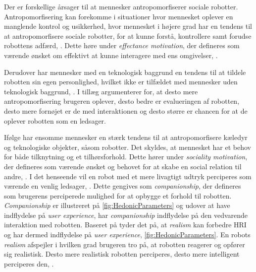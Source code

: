 Der er forskellige årsager til at mennesker antropomorfiserer sociale robotter. Antropomorfisering kan forekomme i situationer hvor mennesket oplever en manglende kontrol og usikkerhed, hvor mennesket i højere grad har en tendens til at antropomorfisere sociale robotter, for at kunne forstå, kontrollere samt forudse robottens adfærd, \parencite[s. 1478]{PDF:ExploringInfluencingVariable}. Dette høre under \textit{effectance motivation}, der defineres som værende ønsket om effektivt at kunne interagere med ens omgivelser, \parencite[s. 62]{PDF:EffectsOfAnticipatedHRI}.

Derudover har mennesker med en teknologisk baggrund en tendens til at tildele robotten sin egen personlighed, hvilket ikke er tilfældet med mennesker uden teknologisk baggrund, \parencite[s. 19]{PDF:CloseButNotStuck}. I tillæg argumenterer \textcite[s. 2]{PDF:SharingALifeHarvey} for, at desto mere antropomorfisering brugeren oplever, desto bedre er evalueringen af robotten, desto mere fornøjet er de med interaktionen og desto større er chancen for at de oplever robotten som en ledsager.

Ifølge \textcite[s. 61]{PDF:EffectsOfAnticipatedHRI} har ensomme mennesker en stærk tendens til at antropomorfisere kæledyr og teknologiske objekter, såsom robotter. Det skyldes, at mennesket har et behov for både tilknytning og et tilhørsforhold. Dette hører under \textit{sociality motivation}, der defineres som værende ønsket og behovet for at skabe en social relation til andre, \parencite[s. 61]{PDF:EffectsOfAnticipatedHRI}. I det henseende vil en robot med et mere livagtigt udtryk perciperes som værende en venlig ledsager, \parencite[s. 1478]{PDF:ExploringInfluencingVariable}. Dette gengives som \textit{companionship}, der defineres som brugerens perciperede mulighed for at opbygge et forhold til robotten. \textit{Companionship} er illustreret på \autoref{fig:HedonicParameters} og udover at have indflydelse på \textit{user experience}, har \textit{companionship} indflydelse på den vedvarende interaktion med robotten. \blankline
%
Baseret på \textcite[s. 1478]{PDF:ExploringInfluencingVariable} tyder det på, at \textit{realism} kan forbedre HRI og har dermed indflydelse på \textit{user experience}, \autoref{fig:HedonicParameters}. En robots \textit{realism} afspejler i hvilken grad brugeren tro på, at robotten reagerer og opfører sig realistisk. Desto mere realistisk robotten perciperes, desto mere intelligent perciperes den, \parencite[s. 1478]{PDF:ExploringInfluencingVariable}. 

